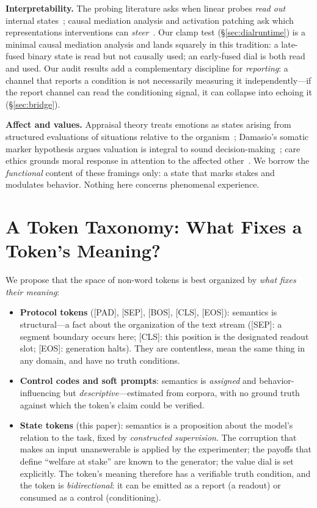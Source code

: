 \documentclass[11pt]{article}
\begin{document}
\textbf{Interpretability.} The probing literature asks when linear probes \emph{read out} internal states~\cite{belinkov2022probing}; causal mediation analysis and activation patching ask which representations interventions can \emph{steer}~\cite{vig2019investigating,geiger2021causal,meng2022locating}. Our clamp test (\S\ref{sec:dialruntime}) is a minimal causal mediation analysis and lands squarely in this tradition: a late-fused binary state is read but not causally used; an early-fused dial is both read and used. Our audit results add a complementary discipline for \emph{reporting}: a channel that reports a condition is not necessarily measuring it independently---if the report channel can read the conditioning signal, it can collapse into echoing it (\S\ref{sec:bridge}).

\textbf{Affect and values.} Appraisal theory treats emotions as states arising from structured evaluations of situations relative to the organism~\cite{scherer2005emotions}; Damasio's somatic marker hypothesis argues valuation is integral to sound decision-making~\cite{damasio1994descartes}; care ethics grounds moral response in attention to the affected other~\cite{gilligan1982different}. We borrow the \emph{functional} content of these framings only: a state that marks stakes and modulates behavior. Nothing here concerns phenomenal experience.

\section{A Token Taxonomy: What Fixes a Token's Meaning?}
\label{sec:taxonomy}

We propose that the space of non-word tokens is best organized by \emph{what fixes their meaning}:

\begin{itemize}
\item \textbf{Protocol tokens} ([PAD], [SEP], [BOS], [CLS], [EOS]): semantics is structural---a fact about the organization of the text stream ([SEP]: a segment boundary occurs here; [CLS]: this position is the designated readout slot; [EOS]: generation halts). They are contentless, mean the same thing in any domain, and have no truth conditions.
\item \textbf{Control codes and soft prompts}: semantics is \emph{assigned} and behavior-influencing but \emph{descriptive}---estimated from corpora, with no ground truth against which the token's claim could be verified.
\item \textbf{State tokens} (this paper): semantics is a proposition about the model's relation to the task, fixed by \emph{constructed supervision}. The corruption that makes an input unanswerable is applied by the experimenter; the payoffs that define ``welfare at stake'' are known to the generator; the value dial is set explicitly. The token's meaning therefore has a verifiable truth condition, and the token is \emph{bidirectional}: it can be emitted as a report (a readout) or consumed as a control (conditioning).
\end{itemize}
\end{document}
